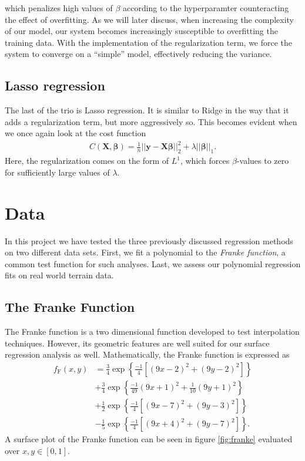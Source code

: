 \documentclass[a4paper, twocolumn]{article}
\begin{document}
which penalizes high values of $\beta$ according to the hyperparamter   counteracting the effect of overfitting. As we will later discuss, when increasing the complexity of our model, our system becomes increasingly susceptible to overfitting the training data. With the implementation of the regularization term, we force the system to converge on a ``simple'' model, effectively reducing the variance. 

\subsection{Lasso regression}
The last of the trio is Lasso regression. It is similar to Ridge in the way that it adds a regularization term, but more aggressively so. This becomes evident when we once again look at the cost function
\begin{align}
  C(\boldsymbol{X},\boldsymbol{\beta})=\frac{1}{n}\vert\vert \boldsymbol{y}-\boldsymbol{X}\boldsymbol{\beta}\vert\vert_2^2+\lambda\vert\vert \boldsymbol{\beta}\vert\vert_1.
\end{align}
Here, the regularization comes on the form of $L^1$, which forces $\beta$-values to zero for sufficiently large values of $\lambda$.


\section{Data}
In this project we have tested the three previously discussed regression methods on two different data sets. First, we fit a polynomial to the \textit{Franke function}, a common test function for such analyses. Last, we assess our polynomial regression fits on real world terrain data.
\subsection{The Franke Function}
The Franke function is a two dimensional function developed to test interpolation techniques. However, its geometric features are well suited for our surface regression analysis as well. Mathematically, the Franke function is expressed as
\begin{align}
f_\text{F}(x,y) &= \frac{3}{4}\exp\left\{\frac{-1}{4}\left[\left(9x-2\right)^2 + \left(9y-2\right)^2\right]\right\}\nonumber \\
&+ \frac{3}{4}\exp\left\{\frac{-1}{49}\left(9x+1\right)^2 + \frac{1}{10}\left(9y+1\right)^2\right\}\nonumber \\
&+ \frac{1}{2}\exp\left\{\frac{-1}{4}\left[\left(9x-7\right)^2 + \left(9y-3\right)^2\right]\right\}\nonumber \\
&- \frac{1}{5}\exp\left\{\frac{-1}{4}\left[\left(9x+4\right)^2 + \left(9y-7\right)^2\right]\right\}.
\end{align}
A surface plot of the Franke function can be seen in figure \ref{fig:franke} evaluated over $x,y \in [0,1]$. 
\end{document}
